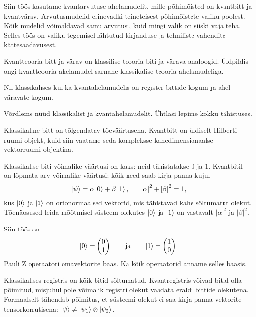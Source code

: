 \documentclass[12pt]{report}
\def\abs#1{\left|#1\right|}
\def\ket#1{\mathinner{|#1\rangle}}
\begin{document}
Siin töös kasutame kvantarvutuse ahelamudelit, mille põhimõisted on kvantbitt ja kvantvärav.
Arvutusmudelid erinevadki teineteisest põhimõistete valiku poolest.
Kõik mudelid võimaldavad samu arvutusi, kuid mingi valik on siiski vaja teha.
Selles töös on valiku tegemisel lähtutud kirjanduse ja tehniliste vahendite kättesaadavusest.

Kvantteooria bitt ja värav on klassilise teooria biti ja värava analoogid.
Üldpildis ongi kvantteooria ahelamudel sarnane klassikalise teooria ahelamudeliga.

Nii klassikalises kui ka kvantahelamudelis on register bittide kogum ja ahel väravate kogum.

Võrdleme nüüd klassikalist ja kvantahelamudelit.
Ühtlasi lepime kokku tähistuses.

Klassikaline bitt on tõlgendatav tõeväärtusena.
Kvantbitt on üldiselt Hilberti ruumi objekt, kuid siin vaatame seda kompleksse kahedimensionaalse vektorruumi objektina.

Klassikalise biti võimalike väärtusi on kaks: neid tähistatakse \(0\) ja \(1\).
Kvantbitil on lõpmata arv võimalike väärtusi: kõik need saab kirja panna kujul
\begin{align}
    \ket{\psi} = \alpha\ket{0} + \beta\ket{1} \rlap{,}
    \qquad \abs{\alpha}^2 + \abs{\beta}^2 = 1 \rlap{,}
\end{align}
kus \(\ket{0}\) ja \(\ket{1}\) on ortonormaalsed vektorid, mis tähistavad kahe sõltumatut olekut.
Tõenäosused leida mõõtmisel süsteem olekutes \(\ket{0}\) ja \(\ket1\) on vastavalt \(\abs{\alpha}^2\) ja \(\abs{\beta}^2\).

Siin töös on
\begin{align}
    \ket{0} = \begin{pmatrix}
        0 \\
        1 \\
    \end{pmatrix}
    \qquad \text{ja} \qquad
    \ket{1} = \begin{pmatrix}
        1 \\
        0 \\
    \end{pmatrix}
\end{align}
Pauli Z operaatori omavektorite baas.
Ka kõik operaatorid anname selles baasis.

Klassikalises registris on kõik bitid sõltumatud.
Kvantregistris võivad bitid olla põimitud, misjuhul pole võimalik registri olekut vaadata eraldi bittide olekutena.
Formaalselt tähendab põimitus, et süsteemi olekut ei saa kirja panna vektorite tensorkorrutisena: \(\ket{\psi} \ne \ket{\psi_1} \otimes \ket{\psi_2}\).
\end{document}
